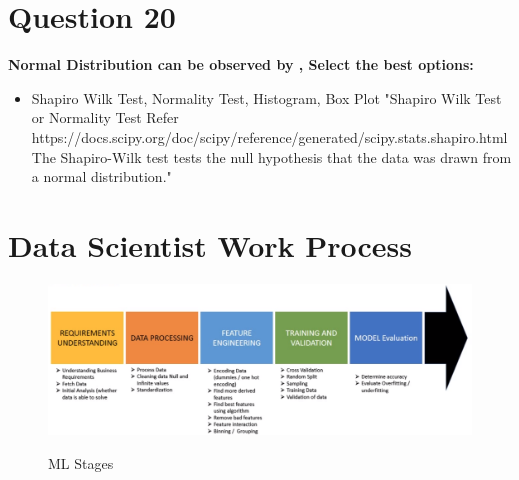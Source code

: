 \documentclass[10pt,letterpaper]{article}
\begin{document}
\section{Question 20}
\textbf{Normal Distribution can be observed by , Select the best options:}
\begin{itemize}
\item Shapiro Wilk Test, Normality Test, Histogram, Box Plot "Shapiro Wilk Test or Normality Test Refer \\
https://docs.scipy.org/doc/scipy/reference/generated/scipy.stats.shapiro.html The Shapiro-Wilk test tests the null hypothesis that the data was drawn from a normal distribution."
\end{itemize}

\section{Data Scientist Work Process}
\begin{figure}[H]
\includegraphics[width=1\textwidth]{different_stages_data_scientist.png}
\centering
\caption{}
\label{figure6}{ML Stages}
\end{figure}
\end{document}
